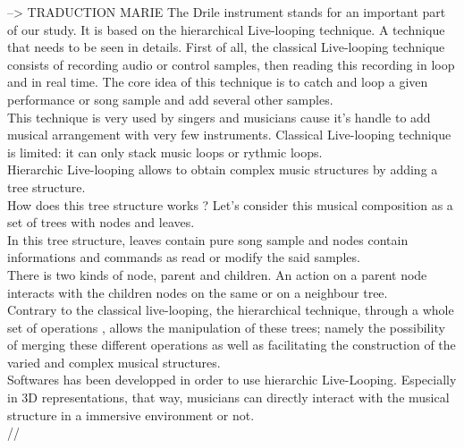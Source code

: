 --> TRADUCTION MARIE
The Drile instrument stands for an important part of our study. It is based on the  hierarchical Live-looping technique. A technique that needs to be seen in details. First of all, the classical Live-looping technique consists of recording audio or control samples, then reading this recording in loop and in real time.
The core idea of this technique is to catch and loop a given performance or song sample and add several other samples.\\
This technique is very used by singers and musicians cause it's handle to add musical arrangement with very few instruments. Classical Live-looping technique is limited: it can only stack music loops or rythmic loops.\\
Hierarchic Live-looping allows to obtain complex music structures by adding a tree structure.\\ 
How does this tree structure works ?
Let's consider this musical composition as a set of trees with nodes and leaves.\\
In this tree structure, leaves contain pure song sample and nodes contain informations and commands as read or modify the said samples.\\
There is two kinds of node, parent and children. An action on a parent node interacts with the children nodes on the same or on a neighbour tree.\\
Contrary to the classical live-looping, the hierarchical technique, through a whole set of operations , allows the manipulation of these trees; namely the possibility of merging these different operations as well as facilitating the construction of the varied and complex musical structures. \\ 
Softwares has been developped in order to use hierarchic Live-Looping. Especially in 3D representations, that way, musicians can directly interact with the musical structure in a immersive environment or not.\\
//

